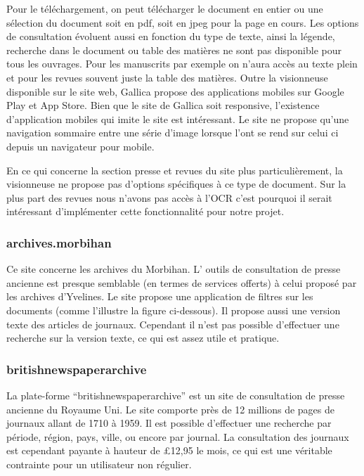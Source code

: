         Pour le téléchargement, on peut télécharger le document en entier ou une sélection du document soit en pdf,
        soit en jpeg pour la page en cours. Les options de consultation évoluent aussi en fonction du type de texte,
        ainsi la légende, recherche dans le document ou table des matières ne sont pas disponible pour tous les ouvrages.
        Pour les manuscrits par exemple on n’aura accès au texte plein et pour les revues souvent juste la table des matières.
        Outre la visionneuse disponible sur le site web, Gallica propose des applications mobiles sur Google Play et App Store.
        Bien que le site de Gallica soit responsive, l'existence d’application mobiles qui imite le site est intéressant.
        Le site ne propose qu’une navigation sommaire entre une série d’image lorsque l’ont se rend sur celui ci depuis un navigateur pour mobile.

        En ce qui concerne la section presse et revues du site plus particulièrement, la visionneuse ne propose
        pas d’options spécifiques à ce type de document. Sur la plus part des revues nous n’avons pas accès à l’OCR
        c’est pourquoi il serait intéressant d’implémenter cette fonctionnalité pour notre projet.

        \subsubsection{archives.morbihan}
        \label{subsubsec:morbihan}
        Ce site concerne les archives du Morbihan. L’ outils de consultation de presse ancienne est presque semblable
        (en termes de services offerts) à celui proposé par les archives d’Yvelines. Le site propose une application
        de filtres sur les documents (comme l’illustre la figure ci-dessous). Il propose aussi une version texte des
        articles de journaux. Cependant il n’est pas possible d’effectuer une recherche sur la version texte,
        ce qui est assez utile et pratique.

        \subsubsection{britishnewspaperarchive}
        \label{subsubsec:britishnewspaper}
        La plate-forme “britishnewspaperarchive” est un site de consultation de presse ancienne du Royaume Uni.
        Le site comporte près de 12 millions de pages de journaux allant de 1710 à 1959. Il est possible
        d’effectuer une recherche par période, région, pays, ville, ou encore par journal. La consultation
        des journaux est cependant payante à hauteur de £12,95 le mois, ce qui est une véritable contrainte
        pour un utilisateur non régulier.

